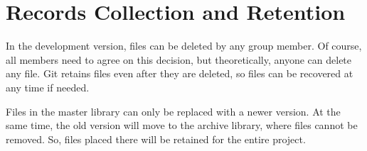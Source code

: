 \chapter{Records Collection and Retention}
\label{chap:recordscollection}
In the development version, files can be deleted by any group member. Of course, all members need to agree on this decision, but theoretically, anyone can delete any file. Git retains files even after they are deleted, so files can be recovered at any time if needed.

Files in the master library can only be replaced with a newer version. At the same time, the old version will move to the archive library, where files cannot be removed. So, files placed there will be retained for the entire project.